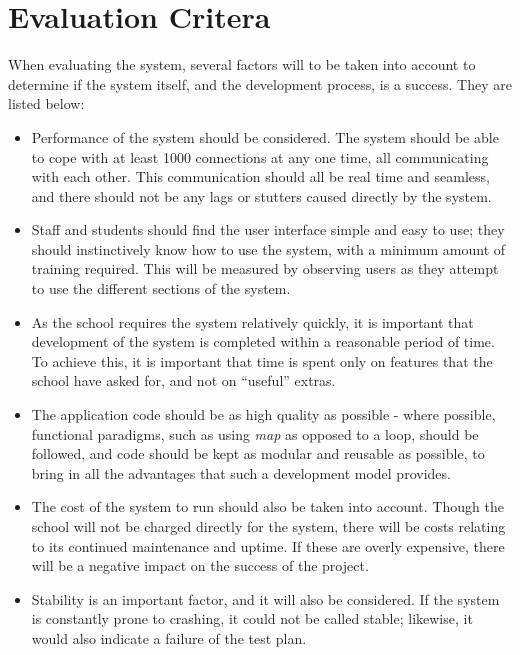 \section{Evaluation Critera}
When evaluating the system, several factors will to be taken into account to determine if the system itself, and the development process, is a success. They are listed below:

\begin{itemize}
\item Performance of the system should be considered. The system should be able to cope with at least 1000 connections at any one time, all communicating with each other. This communication should all be real time and seamless, and there should not be any lags or stutters caused directly by the system.

\item Staff and students should find the user interface simple and easy to use; they should instinctively know how to use the system, with a minimum amount of training required. This will be measured by observing users as they attempt to use the different sections of the system.

\item As the school requires the system relatively quickly, it is important that development of the system is completed within a reasonable period of time. To achieve this, it is important that time is spent only on features that the school have asked for, and not on ``useful'' extras.

\item The application code should be as high quality as possible - where possible, functional paradigms, such as using \textit{map} as opposed to a loop, should be followed, and code should be kept as modular and reusable as possible, to bring in all the advantages that such a development model provides.

\item The cost of the system to run should also be taken into account. Though the school will not be charged directly for the system, there will be costs relating to its continued maintenance and uptime. If these are overly expensive, there will be a negative impact on the success of the project.

\item Stability is an important factor, and it will also be considered. If the system is constantly prone to crashing, it could not be called stable; likewise, it would also indicate a failure of the test plan.


\end{itemize}

